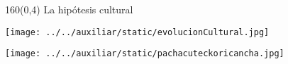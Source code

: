 \documentclass[shownotes,aspectratio=169]{beamer}
\newif\ifen
\newif\ifes
\newcommand{\en}[1]{\ifen#1\fi}
\newcommand{\es}[1]{\ifes#1\fi}
\begin{document}
\begin{frame}[plain]
\begin{textblock}{160}(0,4)
 \centering \LARGE 
 La hipótesis cultural
 \end{textblock}
\vspace{1cm}

\texttt{[image: ../../auxiliar/static/evolucionCultural.jpg]}

\end{frame}
% 
%  
% 
% 
%  
% 
% 

 
\begin{frame}[plain]
\centering
  \texttt{[image: ../../auxiliar/static/pachacuteckoricancha.jpg]}
\end{frame}
\end{document}
